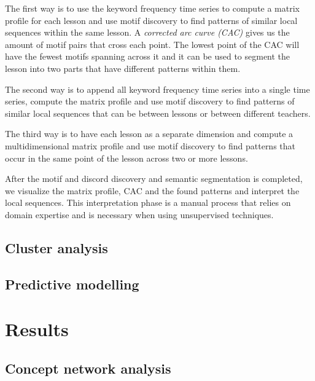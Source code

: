\documentclass[utf8,english]{gradu3}
\begin{document}
The first way is to use the keyword frequency time series to compute a matrix profile for each lesson and use motif discovery to find patterns of similar local sequences within the same lesson. A \emph{corrected arc curve (CAC)} gives us the amount of motif pairs that cross each point. The lowest point of the CAC will have the fewest motifs spanning across it and it can be used to segment the lesson into two parts that have different patterns within them.

The second way is to append all keyword frequency time series into a single time series, compute the matrix profile and use motif discovery to find patterns of similar local sequences that can be between lessons or between different teachers. 

The third way is to have each lesson as a separate dimension and compute a multidimensional matrix profile and use motif discovery to find patterns that occur in the same point of the lesson across two or more lessons.

After the motif and discord discovery and semantic segmentation is completed, we visualize the matrix profile, CAC and the found patterns and interpret the local sequences. This interpretation phase is a manual process that relies on domain expertise and is necessary when using unsupervised techniques.

\section{Cluster analysis}

\section{Predictive modelling}

\chapter{Results}



\section{Concept network analysis}
\end{document}
